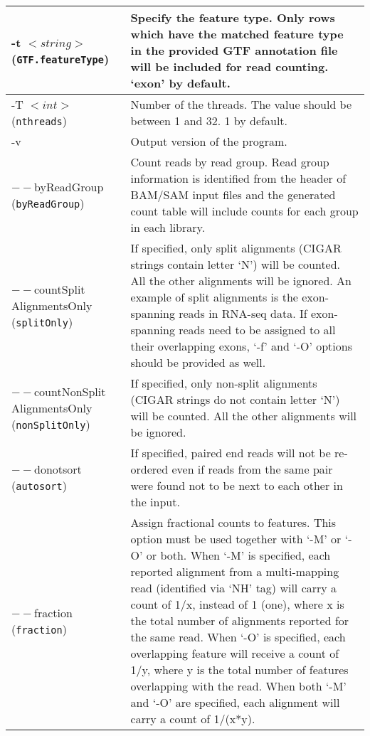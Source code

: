 \documentclass[12pt]{report}
\newcommand{\code}[1]{{\small\texttt{#1}}}
\begin{document}
\begin{longtable}{|p{5cm}|p{11cm}|}
\hline
-t $<string>$ \newline (\code{GTF.featureType}) & Specify the feature type. Only rows which have the matched feature type in the provided GTF annotation file will be included for read counting. `exon' by default.\\
\hline
-T $<int>$ \newline (\code{nthreads}) & Number of the threads. The value should be between 1 and 32. 1 by default.\\
\hline
-v & Output version of the program. \\
\hline
$--$byReadGroup \newline (\code{byReadGroup}) & Count reads by read group. Read group information is identified from the header of BAM/SAM input files and the generated count table will include counts for each group in each library.\\
\hline
$--$countSplit \newline AlignmentsOnly \newline (\code{splitOnly}) & If specified, only split alignments (CIGAR strings contain letter `N') will be counted. All the other alignments will be ignored. An example of split alignments is the exon-spanning reads in RNA-seq data. If exon-spanning reads need to be assigned to all their overlapping exons, `-f' and `-O' options should be provided as well.\\
\hline
$--$countNonSplit  \newline AlignmentsOnly \newline (\code{nonSplitOnly}) & If specified, only non-split alignments (CIGAR strings do not contain letter `N') will be counted. All the other alignments will be ignored.\\
\hline
$--$donotsort \newline (\code{autosort}) & If specified, paired end reads will not be re-ordered even if reads from the same pair were found not to be next to each other in the input.\\
\hline
$--$fraction \newline (\code{fraction}) & Assign fractional counts to features. This option must be used together with `-M' or `-O' or both. When `-M' is specified, each reported alignment from a multi-mapping read (identified via `NH' tag) will carry a count of 1/x, instead of 1 (one), where x is the total number of alignments reported for the same read. When `-O' is specified, each overlapping feature will receive a count of 1/y, where y is the total number of features overlapping with the read. When both `-M' and `-O' are specified, each alignment will carry a count of 1/(x*y).\\

\end{longtable}
\end{document}
